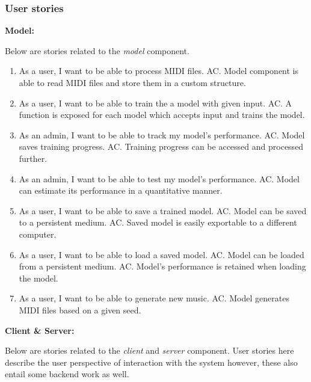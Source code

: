 \documentclass{article}
\begin{document}
\subsubsection{User stories}

\newcommand{\AC}{\subitem AC. }

\textbf{\large Model:}

Below are stories related to the \textit{model} component.

\begin{enumerate}
    \item
          As a user, I want to be able to process MIDI files.
          \AC Model component is able to read MIDI files and store them in a custom structure.

    \item
          As a user, I want to be able to train the a model with given input.
          \AC A function is exposed for each model which accepts input and trains the model.

    \item
          As an admin, I want to be able to track my model's performance.
          \AC Model saves training progress.
          \AC Training progress can be accessed and processed further.

    \item
          As an admin, I want to be able to test my model's performance.
          \AC Model can estimate its performance in a quantitative manner.

    \item
          As a user, I want to be able to save a trained model.
          \AC Model can be saved to a persistent medium.
          \AC Saved model is easily exportable to a different computer.

    \item
          As a user, I want to be able to load a saved model.
          \AC Model can be loaded from a persistent medium.
          \AC Model's performance is retained when loading the model.

    \item
          As a user, I want to be able to generate new music.
          \AC Model generates MIDI files based on a given seed.
\end{enumerate}

\newpage
\textbf{\large Client \& Server:}

Below are stories related to the \textit{client} and \textit{server} component. User stories here describe the user perspective of interaction with the system however, these also entail some backend work as well.
\end{document}
